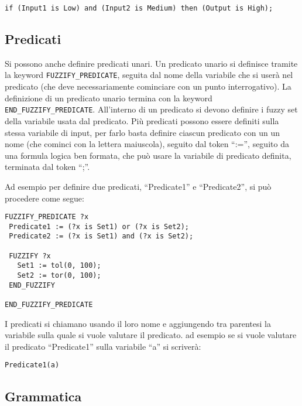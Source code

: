 \begin{lstlisting}[language=fuzzyKnowledgebase]
if (Input1 is Low) and (Input2 is Medium) then (Output is High); 
\end{lstlisting}



\subsection{Predicati}
Si possono anche definire predicati unari. Un predicato unario si definisce tramite la keyword \verb|FUZZIFY_PREDICATE|, seguita dal nome della variabile che si userà nel predicato (che deve necessariamente cominciare con un punto interrogativo). La definizione di un predicato unario termina con la keyword \verb|END_FUZZIFY_PREDICATE|. All'interno di un predicato si devono definire i fuzzy set della variabile usata dal predicato. Più predicati possono essere definiti sulla stessa variabile di input, per farlo basta definire ciascun predicato con un un nome (che cominci con la lettera maiuscola), seguito dal token ``:='', seguito da una formula logica ben formata, che può usare la variabile di predicato definita, terminata dal token ``;''.

Ad esempio per definire due predicati, ``Predicate1'' e ``Predicate2'', si può procedere come segue:
\begin{lstlisting}[language=fuzzyKnowledgebase]
FUZZIFY_PREDICATE ?x
 Predicate1 := (?x is Set1) or (?x is Set2);
 Predicate2 := (?x is Set1) and (?x is Set2);
 
 FUZZIFY ?x
   Set1 := tol(0, 100);
   Set2 := tor(0, 100);
 END_FUZZIFY

END_FUZZIFY_PREDICATE
\end{lstlisting}

I predicati si chiamano usando il loro nome e aggiungendo tra parentesi la variabile sulla quale si vuole valutare il predicato. ad esempio se si vuole valutare il predicato ``Predicate1'' sulla variabile ``a'' si scriverà:
\begin{verbatim}
Predicate1(a)
\end{verbatim}

\subsection{Grammatica}

